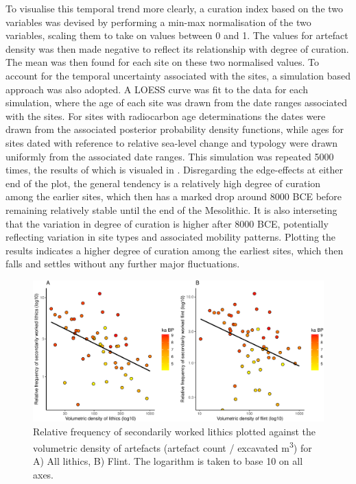 \documentclass[
]{article}
\begin{document}
To visualise this temporal trend more clearly, a curation index based on the two variables was devised by performing a min-max normalisation of the two variables, scaling them to take on values between 0 and 1. The values for artefact density was then made negative to reflect its relationship with degree of curation. The mean was then found for each site on these two normalised values. To account for the temporal uncertainty associated with the sites, a simulation based approach was also adopted. A LOESS curve was fit to the data for each simulation, where the age of each site was drawn from the date ranges associated with the sites. For sites with radiocarbon age determinations the dates were drawn from the associated posterior probability density functions, while ages for sites dated with reference to relative sea-level change and typology were drawn uniformly from the associated date ranges. This simulation was repeated 5000 times, the results of which is visualed in . Disregarding the edge-effects at either end of the plot, the general tendency is a relatively high degree of curation among the earlier sites, which then has a marked drop around 8000 BCE before remaining relatively stable until the end of the Mesolithic. It is also interseting that the variation in degree of curation is higher after 8000 BCE, potentially reflecting variation in site types and associated mobility patterns. Plotting the results indicates a higher degree of curation among the earliest sites, which then falls and settles without any further major fluctuations.

\begin{figure}
\centering
\includegraphics{../figures/wabi-1.pdf}
\caption{\label{fig:wabi}Relative frequency of secondarily worked lithics plotted against the volumetric density of artefacts (artefact count / excavated m\textsuperscript{3}) for A) All lithics, B) Flint. The logarithm is taken to base 10 on all axes.}
\end{figure}
\end{document}
